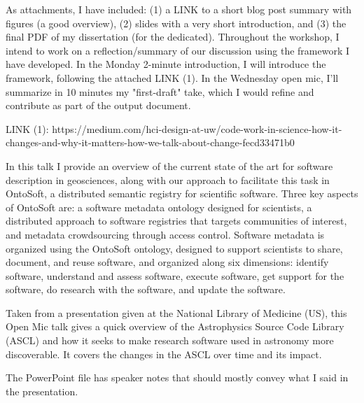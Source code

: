 \documentclass[a4paper,UKenglish]{dagrep}
\begin{document}
As attachments, I have included: (1) a LINK to a short blog post summary with figures (a good overview), (2) slides with a very short introduction, and (3) the final PDF of my dissertation (for the dedicated). Throughout the workshop, I intend to work on a reflection/summary of our discussion using the framework I have developed. In the Monday 2-minute introduction, I will introduce the framework, following the attached LINK (1). In the Wednesday open mic, I'll summarize in 10 minutes my "first-draft" take, which I would refine and contribute as part of the output document.

LINK (1): https://medium.com/hci-design-at-uw/code-work-in-science-how-it-changes-and-why-it-matters-how-we-talk-about-change-fecd33471b0
 

In this talk I provide an overview of the current state of the art for software description in geosciences, along with our approach to facilitate this task in OntoSoft, a distributed semantic registry for scientific software. Three key aspects of OntoSoft are: a software metadata ontology designed for scientists, a distributed approach to software registries that targets communities of interest, and metadata crowdsourcing through access control. Software metadata is organized using the OntoSoft ontology, designed to support scientists to share, document, and reuse software, and organized along six dimensions: identify software, understand and assess software, execute software, get support for the software, do research with the software, and update the software.


Taken from a presentation given at the National Library of Medicine (US), this Open Mic talk gives a quick overview of the Astrophysics Source Code Library (ASCL) and how it seeks to make research software used in astronomy more discoverable. It covers the changes in the ASCL over time and its impact.

The PowerPoint file has speaker notes that should mostly convey what I said in the presentation.

\end{document}
